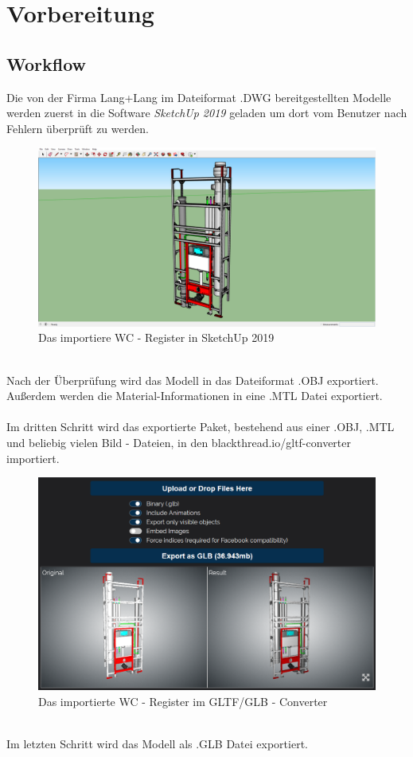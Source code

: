 \section{Vorbereitung}
\subsection*{Workflow}
Die von der Firma Lang+Lang im Dateiformat .DWG bereitgestellten Modelle werden zuerst in die Software \textit{SketchUp 2019} geladen um dort vom Benutzer nach Fehlern überprüft zu werden.
\begin{figure}[h]
    \centering
    \includegraphics[width=1\textwidth]{images/sketchup.PNG}
    \caption{Das importiere WC - Register in SketchUp 2019}
    \label{fig:my_label}
\end{figure}
\\
Nach der Überprüfung wird das Modell in das Dateiformat .OBJ exportiert. \\ Außerdem werden die Material-Informationen in eine .MTL Datei exportiert. \\ \\
Im dritten Schritt wird das exportierte Paket, bestehend aus einer .OBJ, .MTL und beliebig vielen Bild - Dateien, in den blackthread.io/gltf-converter importiert. \\
\begin{figure}[h]
    \centering
    \includegraphics[width=1\textwidth]{images/converter.png}
    \caption{Das importierte WC - Register im GLTF/GLB - Converter \cite{Converter}}
    \label{fig:my_label}
\end{figure} 
\\
Im letzten Schritt wird das Modell als .GLB Datei exportiert.

